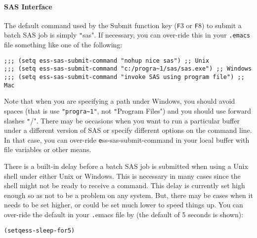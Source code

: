 \documentclass{article}
\newenvironment{Salltt}{\small\begin{alltt}}{\end{alltt}}
\begin{document}
\paragraph{SAS Interface}
\label{sec:SAS:interface}

The default command used by the Submit function key ({\texttt F3} or {\texttt F8}) to
submit a batch SAS job is simply {\texttt "sas"}.  If necessary, you can
over-ride this in your \verb+.emacs+ file something like one of the
following:
{\small
\begin{verbatim}
;;; (setq ess-sas-submit-command "nohup nice sas") ;; Unix
;;; (setq ess-sas-submit-command "c:/progra~1/sas/sas.exe") ;; Windows
;;; (setq ess-sas-submit-command "invoke SAS using program file") ;; Mac
\end{verbatim}
}
Note that when you are specifying a path under Windows, you should
avoid spaces (that is use {\verb+"progra~1"+}, not {\texttt "Program Files"}) and you
should use forward slashes {\texttt "/"}.  There may be occasions when you want
to run a particular buffer under a different version of SAS or specify
different options on the command line.  In that case, you can
over-ride {\texttt ess-sas-submit-command} in your local buffer with file
variables or other means.

There is a built-in delay before a batch SAS job is submitted when using
a Unix shell under either Unix or Windows.  This is necessary in many cases 
since the shell might not be ready to receive a command.  This delay is 
currently set high enough so as not to be a problem on any system.  But,
there may be cases when it needs to be set higher, or could be set much
lower to speed things up.  You can over-ride the default in your {\texttt .emacs}
file by (the default of 5 seconds is shown):
\begin{Salltt}
(setq ess-sleep-for 5)
\end{Salltt}


% 
% 
\end{document}
